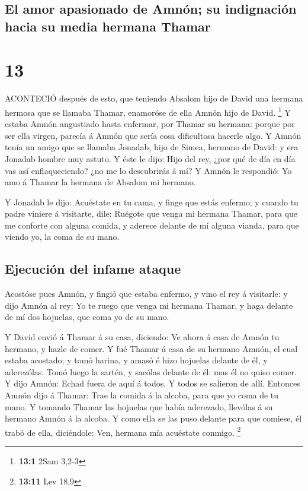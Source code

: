 \hypertarget{el-amor-apasionado-de-amnuxf3n-su-indignaciuxf3n-hacia-su-media-hermana-thamar}{%
\subsection{El amor apasionado de Amnón; su indignación hacia su media
hermana
Thamar}\label{el-amor-apasionado-de-amnuxf3n-su-indignaciuxf3n-hacia-su-media-hermana-thamar}}

\hypertarget{section-12}{%
\section{13}\label{section-12}}

 ACONTECIÓ después de esto, que teniendo Absalom hijo de
David una hermana hermosa que se llamaba Thamar, enamoróse de ella Amnón
hijo de David. \footnote{\textbf{13:1} 2Sam 3,2-3}  Y estaba
Amnón angustiado hasta enfermar, por Thamar su hermana: porque por ser
ella virgen, parecía á Amnón que sería cosa dificultosa hacerle algo.
 Y Amnón tenía un amigo que se llamaba Jonadab, hijo de
Simea, hermano de David: y era Jonadab hombre muy astuto.  Y
éste le dijo: Hijo del rey, ¿por qué de día en día vas así
enflaqueciendo? ¿no me lo descubrirás á mí? Y Amnón le respondió: Yo amo
á Thamar la hermana de Absalom mi hermano.

 Y Jonadab le dijo: Acuéstate en tu cama, y finge que estás
enfermo; y cuando tu padre viniere á visitarte, dile: Ruégote que venga
mi hermana Thamar, para que me conforte con alguna comida, y aderece
delante de mí alguna vianda, para que viendo yo, la coma de su mano.

\hypertarget{ejecuciuxf3n-del-infame-ataque}{%
\subsection{Ejecución del infame
ataque}\label{ejecuciuxf3n-del-infame-ataque}}

 Acostóse pues Amnón, y fingió que estaba enfermo, y vino el
rey á visitarle: y dijo Amnón al rey: Yo te ruego que venga mi hermana
Thamar, y haga delante de mí dos hojuelas, que coma yo de su mano.

 Y David envió á Thamar á su casa, diciendo: Ve ahora á casa
de Amnón tu hermano, y hazle de comer.  Y fué Thamar á casa
de su hermano Amnón, el cual estaba acostado; y tomó harina, y amasó é
hizo hojuelas delante de él, y aderezólas.  Tomó luego la
sartén, y sacólas delante de él: mas él no quiso comer. Y dijo Amnón:
Echad fuera de aquí á todos. Y todos se salieron de allí. 
Entonces Amnón dijo á Thamar: Trae la comida á la alcoba, para que yo
coma de tu mano. Y tomando Thamar las hojuelas que había aderezado,
llevólas á su hermano Amnón á la alcoba.  Y como ella se
las puso delante para que comiese, él trabó de ella, diciéndole: Ven,
hermana mía acuéstate conmigo. \footnote{\textbf{13:11} Lev 18,9}

